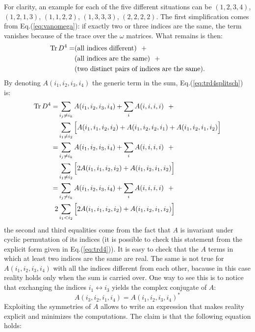 \documentclass[12pt,a4paper]{article}
\DeclareMathOperator{\Tr}{Tr}
\begin{document}
For clarity, an example for each of the five different situations can be $(1, 2, 3, 4)$, $(1, 2, 1, 3)$, $(1, 1, 2, 2)$, $(1, 3, 3, 3)$, $(2, 2, 2, 2)$. \newline
The first simplification comes from Eq.(\ref{eq:vanomega}): if exactly two or three indices are the same, the term vanishes because of the trace over the $\omega$ matrices. What remains is then:
\begin{align}\label{eq:trd4splitsch}
\Tr D^4 = &(\text{all indices different}) \ \ + \notag \\
&(\text{all indices are the same}) \ \ + \notag \\
&(\text{two distinct pairs of indices are the same}).
\end{align}
By denoting $A(i_1, i_2, i_3, i_4)$ the generic term in the sum, Eq.(\ref{eq:trd4splitsch}) is:
\begin{align}\label{eq:trd4split}
\Tr D^4 = &\sum_{i_j \neq i_k} A(i_1, i_2, i_3, i_4) + \sum_{i} A(i,i,i,i) \ \ + \notag \\
&\sum_{i_1 \neq i_2} \Big[ A(i_1, i_1, i_2, i_2) + A(i_1, i_2, i_2, i_1)  + A(i_1, i_2, i_1, i_2) \Big] \notag \\
= &\sum_{i_j \neq i_k} A(i_1, i_2, i_3, i_4) + \sum_{i} A(i,i,i,i) \ \ + \notag \\
&\sum_{i_1 \neq i_2} \Big[ 2A(i_1, i_1, i_2, i_2) + A(i_1, i_2, i_1, i_2) \Big] \notag \\
= &\sum_{i_j \neq i_k} A(i_1, i_2, i_3, i_4) + \sum_{i} A(i,i,i,i) \ \ + \notag \\
2&\sum_{i_1 < i_2} \Big[ 2A(i_1, i_1, i_2, i_2) + A(i_1, i_2, i_1, i_2) \Big]
\end{align}
the second and third equalities come from the fact that $A$ is invariant under cyclic permutation of its indices (it is possible to check this statement from the explicit form given in Eq.(\ref{eq:trd4})). \newline
It is easy to check that the $A$ terms in which at least two indices are the same are real. The same is not true for $A(i_1, i_2, i_3, i_4)$ with all the indices different from each other, bacause in this case reality holds only when the sum is carried over. One way to see this is to notice that exchanging the indices $i_1 \leftrightarrow i_3$ yields the complex conjugate of $A$:
\begin{equation}
A(i_3, i_2, i_1, i_4) = A(i_1, i_2, i_3, i_4)^*
\end{equation}
Exploiting the symmetries of $A$ allows to write an expression that makes reality explicit and minimizes the computations. The claim is that the following equation holds:
\end{document}
